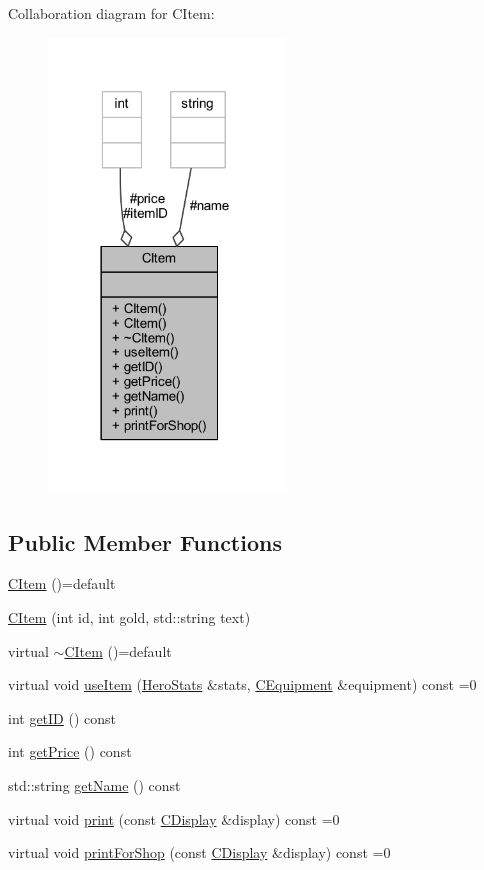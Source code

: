Collaboration diagram for C\+Item\+:\nopagebreak
\begin{figure}[H]
\begin{center}
\leavevmode
\includegraphics[width=177pt]{class_c_item__coll__graph}
\end{center}
\end{figure}
\subsection*{Public Member Functions}
\begin{DoxyCompactItemize}
\item 
\mbox{\hyperlink{class_c_item_a07fbfc14fe69f3c3eca8670d0fe7a2f9}{C\+Item}} ()=default
\item 
\mbox{\hyperlink{class_c_item_ac17c22215b33dd4c108ef145b6eccdb3}{C\+Item}} (int id, int gold, std\+::string text)
\item 
virtual \mbox{\hyperlink{class_c_item_a5c9b1084201fa4d8d41bf89603b33f0a}{$\sim$\+C\+Item}} ()=default
\item 
virtual void \mbox{\hyperlink{class_c_item_a30e8dd9608c78cd43e5c973bfe029baa}{use\+Item}} (\mbox{\hyperlink{struct_hero_stats}{Hero\+Stats}} \&stats, \mbox{\hyperlink{class_c_equipment}{C\+Equipment}} \&equipment) const =0
\item 
int \mbox{\hyperlink{class_c_item_aa1c149049fe94513681131f65c8fdd64}{get\+ID}} () const
\item 
int \mbox{\hyperlink{class_c_item_ac4e9e3fe8b7110d7e89098fdc9cfe611}{get\+Price}} () const
\item 
std\+::string \mbox{\hyperlink{class_c_item_a4287076827e954d45cfa45a7bcc10999}{get\+Name}} () const
\item 
virtual void \mbox{\hyperlink{class_c_item_af35b9c64f05a8377298505b3a81bcd18}{print}} (const \mbox{\hyperlink{class_c_display}{C\+Display}} \&display) const =0
\item 
virtual void \mbox{\hyperlink{class_c_item_af56df4ab4d87984c56401231dd3492cf}{print\+For\+Shop}} (const \mbox{\hyperlink{class_c_display}{C\+Display}} \&display) const =0
\end{DoxyCompactItemize}
